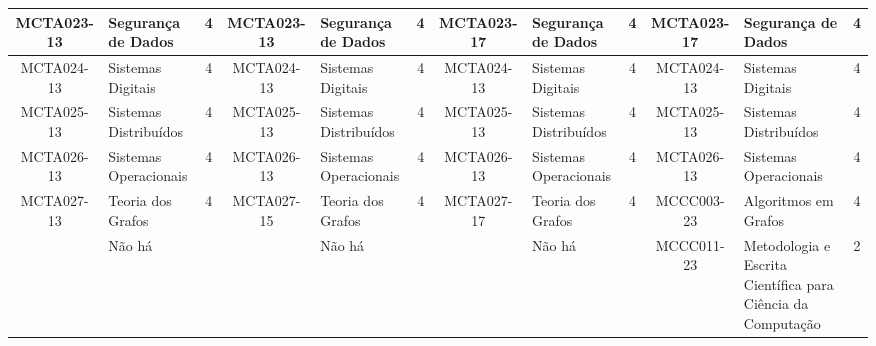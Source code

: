 \documentclass[a4paper]{article}
\begin{document}
\begin{landscape}
{\begin{longtable}{|c|p{.2\textheight}|c||c|p{.2\textheight}|c||c|p{.2\textheight}|c||c|p{.2\textheight}|c|}
    MCTA023-13 & Segurança de Dados & 4 & 
    MCTA023-13 & Segurança de Dados & 4 & 
    MCTA023-17 & Segurança de Dados & 4 & 
    MCTA023-17 & Segurança de Dados & 4 \\ \hline

    MCTA024-13 & Sistemas Digitais & 4 &
    MCTA024-13 & Sistemas Digitais & 4 &
    MCTA024-13 & Sistemas Digitais & 4 &
    MCTA024-13 & Sistemas Digitais & 4 \\ \hline

    MCTA025-13 & Sistemas Distribuídos & 4 &
    MCTA025-13 & Sistemas Distribuídos & 4 & 
    MCTA025-13 & Sistemas Distribuídos & 4 & 
    MCTA025-13 & Sistemas Distribuídos & 4 \\ \hline

    MCTA026-13 & Sistemas Operacionais & 4 & 
    MCTA026-13 & Sistemas Operacionais & 4 & 
    MCTA026-13 & Sistemas Operacionais & 4 & 
    MCTA026-13 & Sistemas Operacionais & 4 \\ \hline

    MCTA027-13 & Teoria dos Grafos & 4 &
    MCTA027-15 & Teoria dos Grafos & 4 &
    MCTA027-17 & Teoria dos Grafos & 4 &
    MCCC003-23 & Algoritmos em Grafos & 4 \\ \hline

    & Não há & &
    & Não há & & 
    & Não há & & 
    MCCC011-23 & Metodologia e Escrita Científica para Ciência da Computação & 2 \\ \hline

\end{longtable}
}
\end{landscape}
\end{document}

